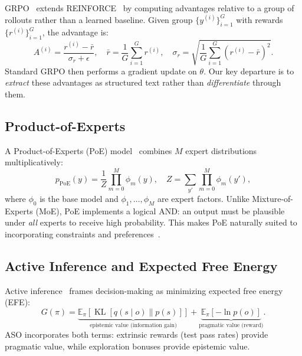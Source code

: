 \documentclass[11pt]{article}
\DeclareMathOperator{\KL}{KL}
\begin{document}
GRPO~\cite{shao2024deepseekmath} extends REINFORCE~\cite{williams1992simple}
by computing advantages relative to a group of rollouts rather than a learned
baseline. Given group $\{y^{(i)}\}_{i=1}^G$ with rewards $\{r^{(i)}\}_{i=1}^G$,
the advantage is:
\begin{equation}
    A^{(i)} = \frac{r^{(i)} - \bar{r}}{\sigma_r + \epsilon},
    \quad \bar{r} = \frac{1}{G}\sum_{i=1}^G r^{(i)},
    \quad \sigma_r = \sqrt{\frac{1}{G}\sum_{i=1}^G (r^{(i)} - \bar{r})^2}.
\end{equation}
Standard GRPO then performs a gradient update on $\theta$. Our key departure is
to \emph{extract} these advantages as structured text rather than
\emph{differentiate} through them.

\subsection{Product-of-Experts}

A Product-of-Experts (PoE) model~\cite{hinton2002training} combines $M$ expert
distributions multiplicatively:
\begin{equation}
    p_{\text{PoE}}(y) = \frac{1}{Z} \prod_{m=0}^{M} \phi_m(y),
    \quad Z = \sum_{y'} \prod_{m=0}^{M} \phi_m(y'),
\end{equation}
where $\phi_0$ is the base model and $\phi_1, \ldots, \phi_M$ are expert
factors. Unlike Mixture-of-Experts (MoE), PoE implements a logical AND: an
output must be plausible under \emph{all} experts to receive high probability.
This makes PoE naturally suited to incorporating constraints and
preferences~\cite{du2023reducing}.

\subsection{Active Inference and Expected Free Energy}

Active inference~\cite{friston2017active} frames decision-making as minimizing
expected free energy (EFE):
\begin{equation}
    G(\pi) = \underbrace{\mathbb{E}_\pi[\KL[q(s \mid o) \| p(s)]]}_{\text{epistemic value (information gain)}}
           + \underbrace{\mathbb{E}_\pi[-\ln p(o)]}_{\text{pragmatic value (reward)}}.
\end{equation}
ASO incorporates both terms: extrinsic rewards (test pass rates) provide
pragmatic value, while exploration bonuses provide epistemic value.

\end{document}
